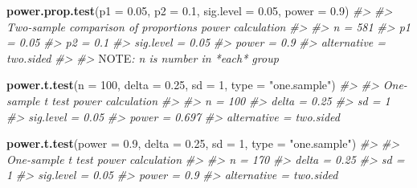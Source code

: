 \documentclass[]{book}
\newenvironment{Shaded}{\begin{snugshade}}{\end{snugshade}}
\newcommand{\KeywordTok}[1]{\textcolor[rgb]{0.13,0.29,0.53}{\textbf{#1}}}
\newcommand{\DataTypeTok}[1]{\textcolor[rgb]{0.13,0.29,0.53}{#1}}
\newcommand{\DecValTok}[1]{\textcolor[rgb]{0.00,0.00,0.81}{#1}}
\newcommand{\FloatTok}[1]{\textcolor[rgb]{0.00,0.00,0.81}{#1}}
\newcommand{\StringTok}[1]{\textcolor[rgb]{0.31,0.60,0.02}{#1}}
\newcommand{\CommentTok}[1]{\textcolor[rgb]{0.56,0.35,0.01}{\textit{#1}}}
\newcommand{\AlertTok}[1]{\textcolor[rgb]{0.94,0.16,0.16}{#1}}
\newcommand{\NormalTok}[1]{#1}
\theoremstyle{definition}
\theoremstyle{definition}
\theoremstyle{definition}
\theoremstyle{remark}
\begin{document}
\begin{Shaded}
\begin{Highlighting}[]
\KeywordTok{power.prop.test}\NormalTok{(}\DataTypeTok{p1 =} \FloatTok{0.05}\NormalTok{, }\DataTypeTok{p2 =} \FloatTok{0.1}\NormalTok{, }\DataTypeTok{sig.level =} \FloatTok{0.05}\NormalTok{, }\DataTypeTok{power =} \FloatTok{0.9}\NormalTok{)}
\CommentTok{#> }
\CommentTok{#>      Two-sample comparison of proportions power calculation }
\CommentTok{#> }
\CommentTok{#>               n = 581}
\CommentTok{#>              p1 = 0.05}
\CommentTok{#>              p2 = 0.1}
\CommentTok{#>       sig.level = 0.05}
\CommentTok{#>           power = 0.9}
\CommentTok{#>     alternative = two.sided}
\CommentTok{#> }
\CommentTok{#> }\AlertTok{NOTE}\CommentTok{: n is number in *each* group}
\end{Highlighting}
\end{Shaded}

\begin{Shaded}
\begin{Highlighting}[]
\KeywordTok{power.t.test}\NormalTok{(}\DataTypeTok{n =} \DecValTok{100}\NormalTok{, }\DataTypeTok{delta =} \FloatTok{0.25}\NormalTok{, }\DataTypeTok{sd =} \DecValTok{1}\NormalTok{, }\DataTypeTok{type =} \StringTok{"one.sample"}\NormalTok{)}
\CommentTok{#> }
\CommentTok{#>      One-sample t test power calculation }
\CommentTok{#> }
\CommentTok{#>               n = 100}
\CommentTok{#>           delta = 0.25}
\CommentTok{#>              sd = 1}
\CommentTok{#>       sig.level = 0.05}
\CommentTok{#>           power = 0.697}
\CommentTok{#>     alternative = two.sided}
\end{Highlighting}
\end{Shaded}

\begin{Shaded}
\begin{Highlighting}[]
\KeywordTok{power.t.test}\NormalTok{(}\DataTypeTok{power =} \FloatTok{0.9}\NormalTok{, }\DataTypeTok{delta =} \FloatTok{0.25}\NormalTok{, }\DataTypeTok{sd =} \DecValTok{1}\NormalTok{, }\DataTypeTok{type =} \StringTok{"one.sample"}\NormalTok{)}
\CommentTok{#> }
\CommentTok{#>      One-sample t test power calculation }
\CommentTok{#> }
\CommentTok{#>               n = 170}
\CommentTok{#>           delta = 0.25}
\CommentTok{#>              sd = 1}
\CommentTok{#>       sig.level = 0.05}
\CommentTok{#>           power = 0.9}
\CommentTok{#>     alternative = two.sided}
\end{Highlighting}
\end{Shaded}
\end{document}
